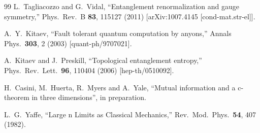 \documentclass[12pt,a4paper]{article}
\begin{document}
\begin{thebibliography}{99}
  L.~Tagliacozzo and G.~Vidal,
  ``Entanglement renormalization and gauge symmetry,''
  Phys.\ Rev.\ B {\bf 83}, 115127 (2011)
  [arXiv:1007.4145 [cond-mat.str-el]].

  A.~Y.~Kitaev,
  ``Fault tolerant quantum computation by anyons,''
  Annals Phys.\  {\bf 303}, 2 (2003)
  [quant-ph/9707021].


  
   A.~Kitaev and J.~Preskill,
  ``Topological entanglement entropy,''
  Phys.\ Rev.\ Lett.\  {\bf 96}, 110404 (2006)
  [hep-th/0510092].

  
H.~Casini, M.~Huerta, R.~Myers and A.~Yale, ``Mutual information and a c-theorem in three dimensions'', in preparation.

 L.~G.~Yaffe,
  ``Large n Limits as Classical Mechanics,''
  Rev.\ Mod.\ Phys.\  {\bf 54}, 407 (1982).

\end{thebibliography}
\end{document}
